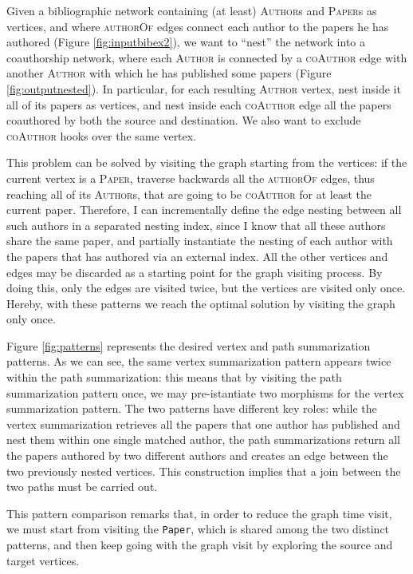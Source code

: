 \begin{example}
		\label{ex:nestingbib}
	Given a bibliographic network containing (at least) \textsc{Author}s and \textsc{Paper}s as vertices, and where \textsc{authorOf} edges connect each author to the papers he has authored (Figure \ref{fig:inputbibex2}), we want to ``nest'' the network into a coauthorship network, where each \textsc{Author} is connected by a \textsc{coAuthor} edge with another  \textsc{Author} with which he has published some papers (Figure \ref{fig:outputnested}). In particular, for each resulting \textsc{Author} vertex, nest inside it all of its papers as vertices, and nest inside each \textsc{coAuthor} edge all the papers coauthored by both the source and destination. We also want to exclude \textsc{coAuthor} hooks over the same vertex.
	
	This problem can be solved by visiting the graph starting from the vertices: if the current vertex is a \textsc{Paper}, traverse backwards all the \textsc{authorOf} edges, thus reaching all of its \textsc{Author}s, that are going to be \textsc{coAuthor} for at least the current paper. Therefore, I can incrementally define the edge nesting between all such authors in a separated nesting index, since I know that all these authors share the same paper, and partially instantiate the nesting of each author with the papers that has authored via an external index. All the other vertices and edges may be discarded as a starting point for the graph visiting process. By doing this, only the edges are visited twice, but the vertices are visited only once. Hereby, with these patterns we reach the optimal solution by visiting the graph only once.
	
	Figure \ref{fig:patterns} represents the desired vertex and path summarization patterns. As we can see, the same vertex summarization pattern appears twice within the path summarization: this means that by visiting the path summarization pattern once, we may pre-istantiate two morphisms for the vertex summarization pattern. The two patterns have different key roles: while the vertex summarization retrieves all the papers that one author has published and nest them within one single matched author, the path summarizations return all the papers authored by two different authors and creates an edge between the two previously nested vertices. This construction implies that a join between the two paths must be carried out. 
	
	This pattern comparison remarks that, in order to reduce the graph time visit, we must start from visiting the \texttt{Paper}, which is shared among the two distinct patterns, and then keep going with the graph visit by exploring the source and target vertices. 
\end{example}

